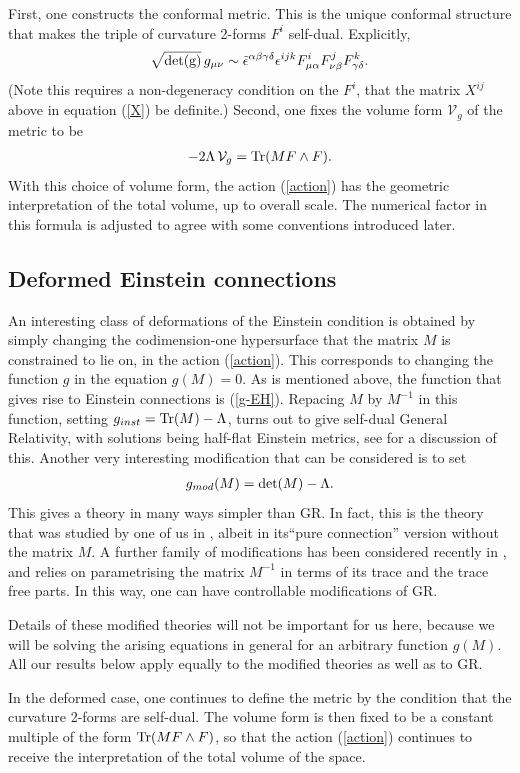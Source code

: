 \documentclass[a4paper,12pt]{article}
\newcommand{\be}{\begin{eqnarray}}
\newcommand{\ee}{\end{eqnarray}}
\begin{document}
First, one constructs the conformal metric. This is the unique conformal structure that makes the triple of curvature 2-forms $F^i$ self-dual. Explicitly, 
\be
\sqrt{{\rm det(g)}} \, g_{\mu\nu} \sim \tilde{\epsilon}^{\alpha\beta\gamma\delta} \epsilon^{ijk} F^i_{\mu\alpha} F^j_{\nu\beta} F^k_{\gamma\delta}.
\ee
(Note this requires a non-degeneracy condition on the $F^i$, that the matrix $X^{ij}$ above in equation (\ref{X}) be definite.) Second, one fixes the volume form ${\mathcal V}_g$ of the metric to be 
\be\label{volume}
- 2\Lambda \, {\mathcal V}_g = {\rm Tr}(M F\wedge F).
\ee
With this choice of volume form, the action (\ref{action}) has the geometric interpretation of the total volume, up to overall scale.  The numerical factor in this formula is adjusted to agree with some conventions introduced later. 

\subsection{Deformed Einstein connections}

An interesting class of deformations of the Einstein condition is obtained by simply changing the codimension-one hypersurface that the matrix $M$ is constrained to lie on, in the action (\ref{action}). This corresponds to changing the function $g$ in the equation $g(M)=0$. As is mentioned above, the function that gives rise to Einstein connections is (\ref{g-EH}). Repacing $M$ by $M^{-1}$ in this function, setting $g_{inst}={\rm Tr}(M) - \Lambda$, turns out to give self-dual General Relativity, with solutions being half-flat Einstein metrics, see \cite{Herfray:2015fpa} for a discussion of this.  Another very interesting modification that can be considered is to set 
\be
g_{mod}(M) = {\rm det}(M) - \Lambda.
\ee
This gives a theory in many ways simpler than GR. In fact, this is the theory that was studied by one of us in \cite{Joel}, albeit in its``pure connection'' version without the matrix $M$.  A further family of modifications has been considered recently in \cite{Herfray:2015fpa}, and relies on parametrising the matrix $M^{-1}$ in terms of its trace and the trace free parts. In this way, one can have controllable modifications of GR. 

Details of these modified theories will not be important for us here, because we will be solving the arising equations in general for an arbitrary function $g(M)$. All our results below apply equally to the modified theories as well as to GR. 

In the deformed case, one continues to define the metric by the condition that the curvature 2-forms are self-dual. The volume form is then fixed to be a constant multiple of the form ${\rm Tr}(M F\wedge F)$, so that the action (\ref{action}) continues to receive the interpretation of the total volume of the space. 
\end{document}
